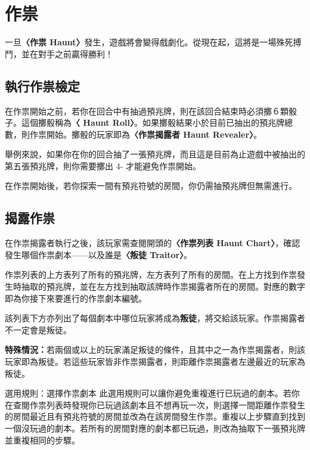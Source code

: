 
\section{作祟} \label{sec:haunt}

一旦\textbf{〈作祟 Haunt〉}發生，遊戲將會變得戲劇化。從現在起，這將是一場殊死搏鬥，並在對手之前贏得勝利！


\subsection{執行作祟檢定} \label{ssec:making-a-haunt-roll}

在作祟開始之前，若你在回合中有抽過預兆牌，則在該回合結束時必須擲６顆骰子。這個擲骰稱為\textbf{〈 Haunt Roll〉}。如果擲骰結果小於目前已抽出的預兆牌總數，則作祟開始。擲骰的玩家即為\textbf{〈作祟揭露者 Haunt Revealer〉}。

舉例來說，如果你在你的回合抽了一張預兆牌，而且這是目前為止遊戲中被抽出的第五張預兆牌，則你需要擲出 4- 才能避免作祟開始。

在作祟開始後，若你探索一間有預兆符號的房間，你仍需抽預兆牌但無需進行。


\subsection{揭露作祟} \label{ssec:revealing-the-roll}

在作祟揭露者執行之後，該玩家需查閱開頭的\textbf{〈作祟列表 Haunt Chart〉}，確認發生哪個作祟劇本——以及誰是\textbf{〈叛徒 Traitor〉}。

作祟列表的上方表列了所有的預兆牌，左方表列了所有的房間。在上方找到作祟發生時抽取的預兆牌，並在左方找到抽取該牌時作祟揭露者所在的房間。對應的數字即為你接下來要進行的作祟劇本編號。

該列表下方亦列出了每個劇本中哪位玩家將成為\textbf{叛徒}，將交給該玩家。作祟揭露者不一定會是叛徒。

\textbf{特殊情況：}若兩個或以上的玩家滿足叛徒的條件，且其中之一為作祟揭露者，則該玩家即為叛徒。若這些玩家皆非作祟揭露者，則距離作祟揭露者左邊最近的玩家為叛徒。

\begin{RuleBox}{選用規則：選擇作祟劇本}
  此選用規則可以讓你避免重複進行已玩過的劇本。若你在查閱作祟列表時發現你已玩過該劇本且不想再玩一次，則選擇一間距離作祟發生的房間最近且有預兆符號\OmenSymbol{}的房間並改為在該房間發生作祟。重複以上步驟直到找到一個沒玩過的劇本。若所有的房間對應的劇本都已玩過，則改為抽取下一張預兆牌並重複相同的步驟。
\end{RuleBox}

